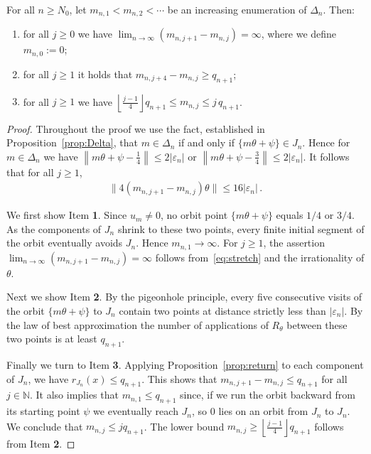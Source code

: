 \documentclass[a4paper,UKenglish,cleveref, autoref, thm-restate]{lipics-v2021}
\begin{document}
\begin{proposition}
For all $n\geq N_0$, let
$m_{n,1} < m_{n,2} < \cdots$ be an increasing enumeration of 
$\Delta_n$.  Then:
\begin{enumerate}
    \item  for all $j \geq 0$ we have $\lim_{n\rightarrow \infty}(m_{n,j+1}-m_{n,j})=\infty$, where we define  $m_{n,0}:=0$;
     \item for all $j\geq 1$  
    it holds that  $m_{n,j+4}-m_{n,j}  \geq {q_{n+1}}$; 
    \item for all $j\geq 1$  
    we have $\left\lfloor\frac{j-1}{4} \right\rfloor q_{n+1} \leq m_{n,j} \leq j \, q_{n+1}$.
\end{enumerate}
\label{prop:gap}
\end{proposition}
\begin{proof}
Throughout the proof we use the fact, established in
Proposition~\ref{prop:Delta}, that $m\in \Delta_n$ if and only if $\{m\theta+\psi\} \in J_n$.  
Hence for $m\in\Delta_n$ we have 
$\left\| m\theta+ \psi - \frac{1}{4}\right\| \leq 2|\varepsilon_n|$ or
$\left\| m \theta +\psi  - \frac{3}{4}\right\| \leq 2|\varepsilon_n|$.
It follows that for all $j\geq 1$, 
\begin{gather}
    \| 4(m_{n,j+1}-m_{n,j})\theta\| \leq 16|\varepsilon_n|\, .
\label{eq:stretch}
\end{gather}

We first show Item {\bf 1}.
Since \(u_m\neq 0\), no orbit point \(\{m\theta+\psi\}\) equals \(1/4\) or \(3/4\). 
As the components of \(J_n\) shrink to these two points, every finite initial segment of the orbit 
eventually avoids \(J_n\). Hence \(m_{n,1}\to\infty\). 
For \(j\geq1\), the assertion $\lim_{n\rightarrow \infty}(m_{n,j+1}-m_{n,j})=\infty$
follows from~\eqref{eq:stretch} and the irrationality of \(\theta\).


Next we show Item {\bf 2}.  By the pigeonhole principle, every
five consecutive visits of the orbit $\{m\theta+\psi\}$ to $J_n$ contain two points at distance strictly less than $|\varepsilon_n|$.
By the law of best approximation the number of applications of $R_\theta$ between these two points is at least $q_{n+1}$.

Finally we turn to Item {\bf 3}.  Applying Proposition~\ref{prop:return} to each component of $J_n$, we have  $r_{J_n}(x)\leq q_{n+1}$.  
This shows that $m_{n,j+1}-m_{n,j} \leq q_{n+1}$ for all $j \in \mathbb N$.  It also implies that $m_{n,1}\leq q_{n+1}$ since, if we 
run the orbit backward from its starting point $\psi$ we eventually reach $J_n$,
so 0 lies on an orbit from $J_n$ to $J_n$.
We conclude that $m_{n,j} \leq jq_{n+1}$. 
The lower bound $m_{n,j} \geq \left\lfloor\frac{j-1}{4} \right\rfloor q_{n+1}$ follows from Item {\bf 2}.
\end{proof}
\end{document}
